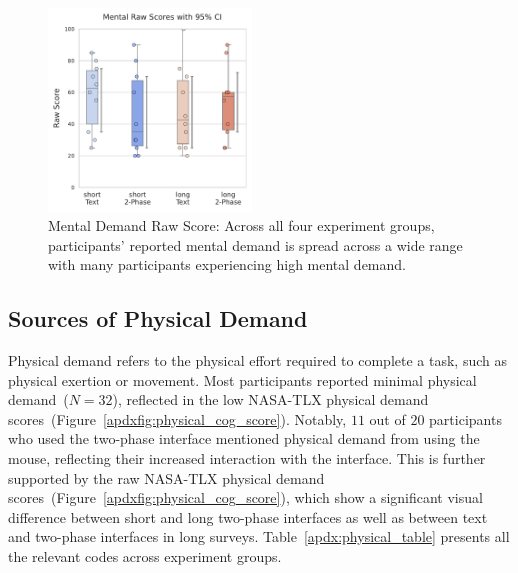 \begin{figure}[t!]
    \centering
    \includegraphics[width=0.48\textwidth, trim=0 13 0 13, clip]{content/image/cog/Mental_scores.pdf}
    \caption{Mental Demand Raw Score: Across all four experiment groups, participants' reported mental demand is spread across a wide range with many participants experiencing high mental demand.}
    \label{fig:mental_cog_score}
\end{figure}

\subsection{Sources of Physical Demand} 
\label{apdx:physical}
Physical demand refers to the physical effort required to complete a task, such as physical exertion or movement. Most participants reported minimal physical demand~($N=32$), reflected in the low NASA-TLX physical demand scores~(Figure~\ref{apdxfig:physical_cog_score}). Notably, $11$ out of $20$ participants who used the two-phase interface mentioned physical demand from using the mouse, reflecting their increased interaction with the interface. This is further supported by the raw NASA-TLX physical demand scores~(Figure~\ref{apdxfig:physical_cog_score}), which show a significant visual difference between short and long two-phase interfaces as well as between text and two-phase interfaces in long surveys. Table~\ref{apdx:physical_table} presents all the relevant codes across experiment groups.

